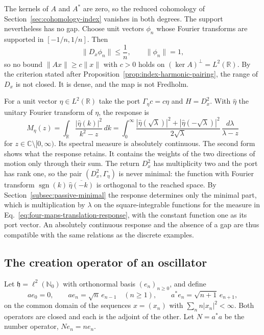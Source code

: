 \documentclass[11pt]{article}
\theoremstyle{definition}
\newcommand{\C}{\mathbb C}
\newcommand{\R}{\mathbb R}
\begin{document}
The kernels of $A$ and $A^*$ are zero, so the reduced cohomology of Section~\ref{sec:cohomology-index} vanishes in both degrees. The support nevertheless has no gap. Choose unit vectors $\phi_n$ whose Fourier transforms are supported in $[-1/n,1/n]$. Then
\begin{equation}
 \|D_x\phi_n\|\le\frac1n,\qquad\|\phi_n\|=1 ,
 \label{eq:four-maps-translation-no-gap}
\end{equation}
so no bound $\|Ax\|\ge c\|x\|$ with $c>0$ holds on $(\ker A)^\perp=L^2(\R)$. By the criterion stated after Proposition~\ref{prop:index-harmonic-pairing}, the range of $D_x$ is not closed. It is dense, and the map is not Fredholm.

For a unit vector $\eta\in L^2(\R)$ take the port $\Gamma_\eta c=c\eta$ and $H=D_x^2$. With $\widehat\eta$ the unitary Fourier transform of $\eta$, the response is
\begin{equation}
 M_\eta(z)=\int_\R\frac{|\widehat\eta(k)|^2}{k^2-z}\,dk
   =\int_0^\infty\frac{|\widehat\eta(\sqrt\lambda)|^2+|\widehat\eta(-\sqrt\lambda)|^2}{2\sqrt\lambda}\,\frac{d\lambda}{\lambda-z}
 \label{eq:four-maps-translation-response}
\end{equation}
for $z\in\C\setminus[0,\infty)$.
Its spectral measure is absolutely continuous. The second form shows what the response retains. It contains the weights of the two directions of motion only through their sum. The return $D_x^2$ has multiplicity two and the port has rank one, so the pair $(D_x^2,\Gamma_\eta)$ is never minimal: the function with Fourier transform $\operatorname{sgn}(k)\,\overline{\widehat\eta(-k)}$ is orthogonal to the reached space. By Section~\ref{subsec:passive-minimal} the response determines only the minimal part, which is multiplication by $\lambda$ on the square-integrable functions for the measure in Eq.~\eqref{eq:four-maps-translation-response}, with the constant function one as its port vector. An absolutely continuous response and the absence of a gap are thus compatible with the same relations as the discrete examples.

\subsection{The creation operator of an oscillator}
\label{subsec:four-maps-oscillator}

Let $\mathfrak h=\ell^2(\mathbb N_0)$ with orthonormal basis $(e_n)_{n\ge0}$, and define
\begin{equation}
 ae_0=0,\qquad ae_n=\sqrt n\,e_{n-1}\quad(n\ge1),\qquad a^*e_n=\sqrt{n+1}\,e_{n+1},
 \label{eq:four-maps-ladder}
\end{equation}
on the common domain of the sequences $x=(x_n)$ with $\sum_nn|x_n|^2<\infty$. Both operators are closed and each is the adjoint of the other. Let $N=a^*a$ be the number operator, $Ne_n=ne_n$.
\end{document}
